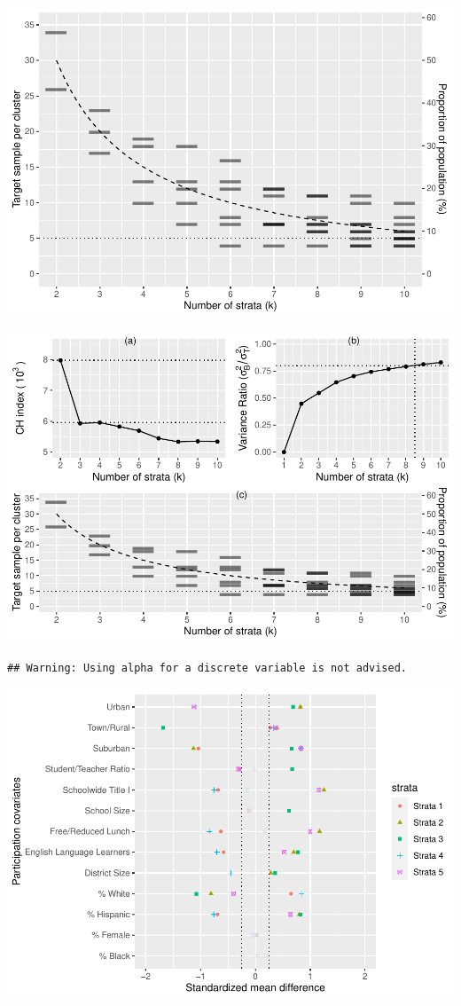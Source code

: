 \documentclass[
  english,
  man,floatsintext]{apa6}
\begin{document}
\includegraphics{5---Analysis_files/figure-latex/unnamed-chunk-6-1.pdf}

\includegraphics{5---Analysis_files/figure-latex/unnamed-chunk-7-1.pdf}

\begin{verbatim}
## Warning: Using alpha for a discrete variable is not advised.
\end{verbatim}

\includegraphics{5---Analysis_files/figure-latex/unnamed-chunk-9-1.pdf}
\end{document}
